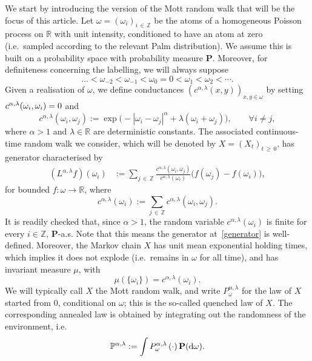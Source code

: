 \documentclass[10pt]{amsart}
\theoremstyle{definition}\newtheorem{defi}[theo]{Definition}\newtheorem{rema}[theo]{Remark}\newtheorem{exam}[theo]{Example}\newtheorem{exem}[theo]{Example}\newtheorem{nota}[theo]{Notation}
\newcommand{\Z}{\mathbb Z}
\newcommand{\R}{\mathbb R}
\renewcommand{\P}{\mathbb P}
\newcommand{\bfP}{\mathbf{P}}
\newcommand{\dd}{\text{\upshape{d}}}
\let\oldforall\forall
\renewcommand*{\forall}{\mathrel{\oldforall}}
\begin{document}
We start by introducing the version of the Mott random walk that will be the focus of this article. Let $\omega=(\omega_i)_{i\,\in\,\Z}$ be the atoms of a homogeneous Poisson process on $\R$ with unit intensity, conditioned to have an atom at zero (i.e.\ sampled according to the relevant Palm distribution). We assume this is built on a probability space with probability measure $\bfP$. Moreover, for definiteness concerning the labelling, we will always suppose
\[
\dots <\omega_{-2}< \omega_{-1}<\omega_0=0<\omega_1<\omega_2<\cdots.
\]
Given a realisation of $\omega$, we define conductances $(c^{\alpha,\lambda}(x,y))_{x,y\in \omega}$ by setting $c^{\alpha,\lambda}(\omega_i,\omega_i)\\=0$ and
\begin{equation}\label{cdef}
c^{\alpha,\lambda}(\omega_i,\omega_j):=\exp\big(-|\omega_i-\omega_j|^\alpha+\lambda(\omega_i+\omega_j)\big),\qquad \forall i\neq j,
\end{equation}
where $\alpha>1$ and $\lambda\in\R$ are deterministic constants. The associated continuous-time random walk we consider, which will be denoted by $X=(X_t)_{t\,\geq\,0}$, has generator characterised by
\begin{align}\label{generator}
\left(L^{\alpha,\lambda}f\right)(\omega_i)&:=\sum_{j\,\in\,\Z}\frac{c^{\alpha,\lambda}(\omega_i,\omega_j)}{c^{\alpha,\lambda}(\omega_i)}\big(f(\omega_j)-f(\omega_i)\big),
\end{align}
for bounded $f:\omega\rightarrow\R$, where
\[
c^{\alpha,\lambda}(\omega_i):=\sum_{j\,\in\,\Z}c^{\alpha,\lambda}(\omega_i,\omega_j).
\]
It is readily checked that, since $\alpha>1$, the random variable $c^{\alpha,\lambda}(\omega_i)$ is finite for every $i\in \Z$, $\bfP$-a.s. Note that this means the generator at~\eqref{generator} is well-defined. Moreover, the Markov chain $X$ has unit mean exponential holding times, which implies it does not explode (i.e.\ remains in $\omega$ for all time), and has invariant measure $\mu$, with
\begin{equation}\label{eq:def_invariant}
\mu(\{\omega_i\})=c^{\alpha,\lambda}(\omega_i).
\end{equation}
We will typically call $X$ the Mott random walk, and write $P^{\alpha,\lambda}_\omega$ for the law of $X$ started from $0$, conditional on $\omega$; this is the so-called quenched law of $X$. The corresponding annealed law is obtained by integrating out the randomness of the environment, i.e.\
\[
\P^{\alpha,\lambda}:=\int P^{\alpha,\lambda}_\omega\left(\cdot\right)\bfP(\dd\omega).
\]
\end{document}
